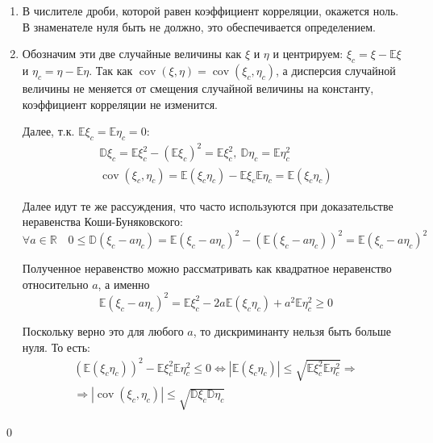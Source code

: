 \documentclass[oneside,final,14pt]{extreport}
\renewenvironment{proof}{{\bfseries Доказательство.}}{\qed}
\theoremstyle{definition}
\begin{document}
\begin{proof}
    \begin{enumerate}
    \item В числителе дроби, которой равен коэффициент корреляции,
окажется ноль. В знаменателе нуля быть не должно, это обеспечивается определением.

    \item  Обозначим эти две случайные величины как $\xi$ и $\eta$ и центрируем: $\xi_c = \xi - \mathbb{E}\xi$ и $\eta_c = \eta - \mathbb{E}\eta$. Так как $\operatorname{cov}(\xi, \eta)=\operatorname{cov}\left(\xi_{c}, \eta_{c}\right)$, а дисперсия случайной величины не меняется от смещения случайной величины на константу, коэффициент корреляции не изменится.
    
    Далее, т.к. $\mathbb{E} \xi_{c}=\mathbb{E} \eta_{c}=0$:
    \begin{gather*}
        \mathbb{D} \xi_{c}=\mathbb{E} \xi_{c}^{2}-\left(\mathbb{E} \xi_{c}\right)^{2}=\mathbb{E} \xi_{c}^{2},~ \mathbb{D} \eta_{c}=\mathbb{E} \eta_{c}^{2} \\
        \operatorname{cov}\left(\xi_{c}, \eta_{c}\right)=\mathbb{E}\left(\xi_{c} \eta_{c}\right)-\mathbb{E} \xi_{c} \mathbb{E} \eta_{c}=\mathbb{E}\left(\xi_{c} \eta_{c}\right)
    \end{gather*}
    
    Далее идут те же рассуждения, что часто используются при доказательстве неравенства Коши-Буняковского:
    \begin{equation*}
        \forall a \in \mathbb{R} \quad 0 \leqslant \mathbb{D}\left(\xi_{c}-a \eta_{c}\right)=\mathbb{E}\left(\xi_{c}-a \eta_{c}\right)^{2}-\left(\mathbb{E}\left(\xi_{c}-a \eta_{c}\right)\right)^{2}=\mathbb{E}\left(\xi_{c}-a \eta_{c}\right)^{2}
    \end{equation*}
    
    Полученное неравенство можно рассматривать как квадратное неравенство относительно $a$, а именно
    \begin{equation*}
        \mathbb{E}\left(\xi_{c}-a \eta_{c}\right)^{2}=\mathbb{E} \xi_{c}^{2}-2 a \mathbb{E}\left(\xi_{c} \eta_{c}\right)+a^{2} \mathbb{E} \eta_{c}^{2} \geqslant 0
    \end{equation*}
    
    Поскольку верно это для любого $a$, то дискриминанту нельзя быть больше нуля. То есть:
    \begin{multline*}
        \left(\mathbb{E}\left(\xi_{c} \eta_{c}\right)\right)^{2}-\mathbb{E} \xi_{c}^{2} \mathbb{E} \eta_{c}^{2} \leqslant 0 \Longleftrightarrow\left|\mathbb{E}\left(\xi_{c} \eta_{c}\right)\right| \leqslant \sqrt{\mathbb{E} \xi_{c}^{2} \mathbb{E} \eta_{c}^{2}} \Rightarrow \\
        \Rightarrow\left|\operatorname{cov}\left(\xi_{c}, \eta_{c}\right)\right| \leqslant \sqrt{\mathbb{D} \xi_{c} \mathbb{D} \eta_{c}}
    \end{multline*}
    

\end{enumerate}
\end{proof}
\end{document}
